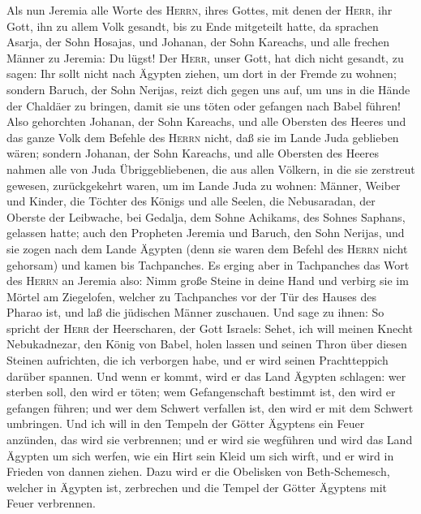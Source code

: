  Als nun Jeremia alle Worte des \textsc{Herrn}, ihres
Gottes, mit denen der \textsc{Herr}, ihr Gott, ihn zu allem Volk
gesandt, bis zu Ende mitgeteilt hatte,  da sprachen
Asarja, der Sohn Hosajas, und Johanan, der Sohn Kareachs, und alle
frechen Männer zu Jeremia: Du lügst! Der \textsc{Herr}, unser Gott, hat
dich nicht gesandt, zu sagen: Ihr sollt nicht nach Ägypten ziehen, um
dort in der Fremde zu wohnen;  sondern Baruch, der Sohn
Nerijas, reizt dich gegen uns auf, um uns in die Hände der Chaldäer zu
bringen, damit sie uns töten oder gefangen nach Babel führen!
 Also gehorchten Johanan, der Sohn Kareachs, und alle
Obersten des Heeres und das ganze Volk dem Befehle des \textsc{Herrn}
nicht, daß sie im Lande Juda geblieben wären;  sondern
Johanan, der Sohn Kareachs, und alle Obersten des Heeres nahmen alle von
Juda Übriggebliebenen, die aus allen Völkern, in die sie zerstreut
gewesen, zurückgekehrt waren, um im Lande Juda zu wohnen: 
Männer, Weiber und Kinder, die Töchter des Königs und alle Seelen, die
Nebusaradan, der Oberste der Leibwache, bei Gedalja, dem Sohne Achikams,
des Sohnes Saphans, gelassen hatte; auch den Propheten Jeremia und
Baruch, den Sohn Nerijas,  und sie zogen nach dem Lande
Ägypten (denn sie waren dem Befehl des \textsc{Herrn} nicht gehorsam)
und kamen bis Tachpanches.  Es erging aber in Tachpanches
das Wort des \textsc{Herrn} an Jeremia also:  Nimm große
Steine in deine Hand und verbirg sie im Mörtel am Ziegelofen, welcher zu
Tachpanches vor der Tür des Hauses des Pharao ist, und laß die jüdischen
Männer zuschauen.  Und sage zu ihnen: So spricht der
\textsc{Herr} der Heerscharen, der Gott Israels: Sehet, ich will meinen
Knecht Nebukadnezar, den König von Babel, holen lassen und seinen Thron
über diesen Steinen aufrichten, die ich verborgen habe, und er wird
seinen Prachtteppich darüber spannen.  Und wenn er kommt,
wird er das Land Ägypten schlagen: wer sterben soll, den wird er töten;
wem Gefangenschaft bestimmt ist, den wird er gefangen führen; und wer
dem Schwert verfallen ist, den wird er mit dem Schwert umbringen.
 Und ich will in den Tempeln der Götter Ägyptens ein
Feuer anzünden, das wird sie verbrennen; und er wird sie wegführen und
wird das Land Ägypten um sich werfen, wie ein Hirt sein Kleid um sich
wirft, und er wird in Frieden von dannen ziehen.  Dazu
wird er die Obelisken von Beth-Schemesch, welcher in Ägypten ist,
zerbrechen und die Tempel der Götter Ägyptens mit Feuer verbrennen.

